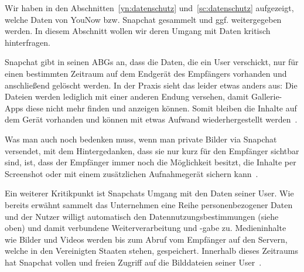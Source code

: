 Wir haben in den Abschnitten~\ref{yn:datenschutz} und~\ref{sc:datenschutz}
aufgezeigt, welche Daten von YouNow bzw. Snapchat gesammelt und ggf.
weitergegeben werden. In diesem Abschnitt wollen wir deren Umgang mit Daten
kritisch hinterfragen.

Snapchat gibt in seinen ABGs an, dass die Daten, die ein User verschickt, nur
f\"ur einen bestimmten Zeitraum auf dem Endger\"at des Empf\"angers vorhanden
und anschlie{\ss}end gel\"oscht werden. In der Praxis sieht das leider etwas
anders aus: Die Dateien werden lediglich mit einer anderen Endung versehen,
damit Gallerie-Apps diese nicht mehr finden und anzeigen k\"onnen. Somit
bleiben die Inhalte auf dem Ger\"at vorhanden und k\"onnen mit etwas Aufwand
wiederhergestellt werden~\cite{sc_risiken}.

Was man auch noch bedenken muss, wenn man private Bilder via Snapchat
versendet, mit dem Hintergedanken, dass sie nur kurz f\"ur den Empf\"anger
sichtbar sind, ist, dass der Empf\"anger immer noch die M\"oglichkeit besitzt,
die Inhalte per Screenshot oder mit einem zus\"atzlichen Aufnahmeger\"at
sichern kann~\cite{sc_risiken}.

Ein weiterer Kritikpunkt ist Snapchats Umgang mit den Daten seiner User. Wie
bereits erw\"ahnt sammelt das Unternehmen eine Reihe personenbezogener Daten
und der Nutzer willigt automatisch den Datennutzungsbestimmungen (siehe oben)
und damit verbundene Weiterverarbeitung und -gabe zu. Medieninhalte wie Bilder
und Videos werden bis zum Abruf vom Empf\"anger auf den Servern, welche in den
Vereinigten Staaten stehen, gespeichert. Innerhalb dieses Zeitraums hat
Snapchat vollen und freien Zugriff auf die Bilddateien seiner
User~\cite{sc_risiken}.
